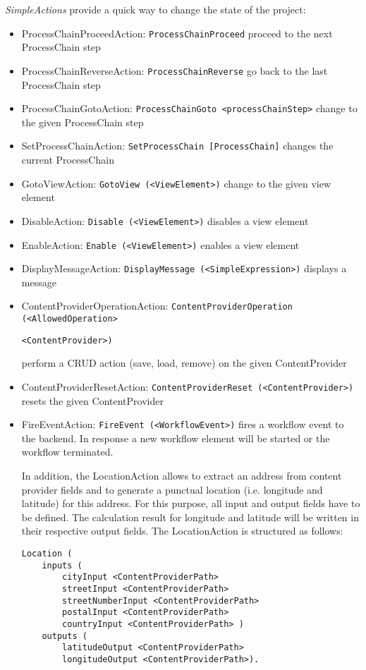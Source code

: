 \textit{SimpleActions} provide a quick way to change the state of the project:
\begin{itemize}
\item ProcessChainProceedAction: \lstinline!ProcessChainProceed!
\subitem proceed to the next ProcessChain step
\item ProcessChainReverseAction: \lstinline!ProcessChainReverse!
\subitem go back to the last ProcessChain step
\item ProcessChainGotoAction: \lstinline!ProcessChainGoto <processChainStep>!
\subitem change to the given ProcessChain step
\item SetProcessChainAction: \lstinline!SetProcessChain [ProcessChain]!
\subitem changes the current ProcessChain
\item GotoViewAction: \lstinline!GotoView (<ViewElement>)!
\subitem change to the given view element
\item DisableAction: \lstinline!Disable (<ViewElement>)!
\subitem disables a view element
\item EnableAction: \lstinline!Enable (<ViewElement>)!
\subitem enables a view element
\item DisplayMessageAction: \lstinline!DisplayMessage (<SimpleExpression>)!
\subitem displays a message
\item {ContentProviderOperationAction: \lstinline!ContentProviderOperation (<AllowedOperation>!

 \lstinline!<ContentProvider>)!}
\subitem perform a CRUD action (save, load, remove) on the given ContentProvider
\item ContentProviderResetAction: \lstinline!ContentProviderReset (<ContentProvider>)!
\subitem resets the given ContentProvider
\item FireEventAction: \lstinline!FireEvent (<WorkflowEvent>)!
\subitem fires a workflow event to the backend. In response a new workflow element will be started or the workflow terminated.


In addition, the LocationAction allows to extract an address from content provider fields and to generate a punctual location (i.e. longitude and latitude) for this address. For this purpose, all input and output fields have to be defined. The calculation result for longitude and latitude will be written in their respective output fields. The LocationAction is structured as follows:

\begin{lstlisting}
Location (
	inputs (
		cityInput <ContentProviderPath>
		streetInput <ContentProviderPath>
		streetNumberInput <ContentProviderPath>
		postalInput <ContentProviderPath>
		countryInput <ContentProviderPath> )
	outputs (
		latitudeOutput <ContentProviderPath>
		longitudeOutput <ContentProviderPath>).
\end{lstlisting}

 
\end{itemize}

